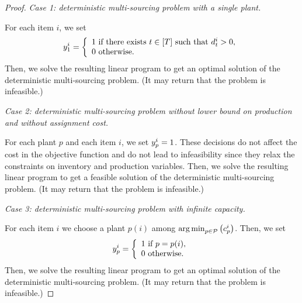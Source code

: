 \begin{proof}
\emph{Case 1: deterministic multi-sourcing problem with a single plant.}


For each item $i$, we set
\begin{equation}
\open_1^i=
\left\{
\begin{array}{l}
1\mbox{ if there exists }t\in\range{\horizon}\mbox{ such that }\demand_t^i>0,\\
0\mbox{ otherwise}.
\end{array}
\right.
\end{equation}
Then, we solve the resulting linear program to get an optimal solution of the deterministic multi-sourcing problem.
(It may return that the problem is infeasible.)


\medskip


\emph{Case 2: deterministic multi-sourcing problem without lower bound on production and without assignment cost.}


For each plant $p$ and each item $i$, we set $y_p^i=1$.
These decisions do not affect the cost in the objective function and do not lead to infeasibility since they relax the constraints on inventory and production variables.
Then, we solve the resulting linear program to get a feasible solution of the deterministic multi-sourcing problem.
(It may return that the problem is infeasible.)


\medskip


\emph{Case 3: deterministic multi-sourcing problem with infinite capacity.}


For each item $i$ we choose a plant $p(i)$ among $\argmin_{p\in\plants}\bracket{\affect_p^i}$.
Then, we set
\begin{equation}
\open_p^i=
\left\{
\begin{array}{l}
1\mbox{ if }p=p(i),\\
0\mbox{ otherwise}.
\end{array}
\right.
\end{equation}
Then, we solve the resulting linear program to get an optimal solution of the deterministic multi-sourcing problem.
(It may return that the problem is infeasible.)
\end{proof}


